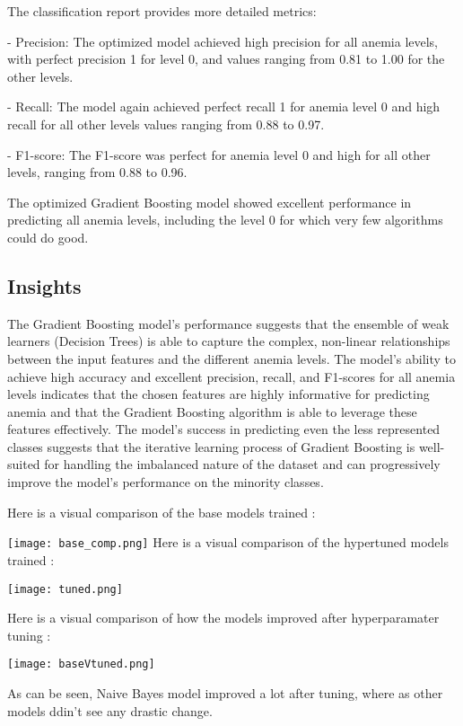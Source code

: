 The classification report provides more detailed metrics:


- Precision: The optimized model achieved high precision for all anemia levels, with perfect precision 1 for level 0, and values ranging from 0.81 to 1.00 for the other levels.


- Recall: The model again achieved perfect recall 1 for anemia level 0 and high recall for all other levels values ranging from 0.88 to 0.97.


- F1-score: The F1-score was perfect for anemia level 0 and high for all other levels, ranging from 0.88 to 0.96.

The optimized Gradient Boosting model showed excellent performance in predicting all anemia levels, including the level 0 for which very few algorithms could do good.


\subsection{Insights}

The Gradient Boosting model's performance suggests that the ensemble of weak learners (Decision Trees) is able to capture the complex, non-linear relationships between the input features and the different anemia levels. The model's ability to achieve high accuracy and excellent precision, recall, and F1-scores for all anemia levels indicates that the chosen features are highly informative for predicting anemia and that the Gradient Boosting algorithm is able to leverage these features effectively. The model's success in predicting even the less represented classes suggests that the iterative learning process of Gradient Boosting is well-suited for handling the imbalanced nature of the dataset and can progressively improve the model's performance on the minority classes.


Here is a visual comparison of the base models trained :

\texttt{[image: base\_comp.png]}
\clearpage
Here is a visual comparison of the hypertuned models trained :

\texttt{[image: tuned.png]}

Here is a visual comparison of how the models improved after hyperparamater tuning :

\texttt{[image: baseVtuned.png]}

As can be seen, Naive Bayes model improved a lot after tuning, where as other models ddin't see any drastic change.